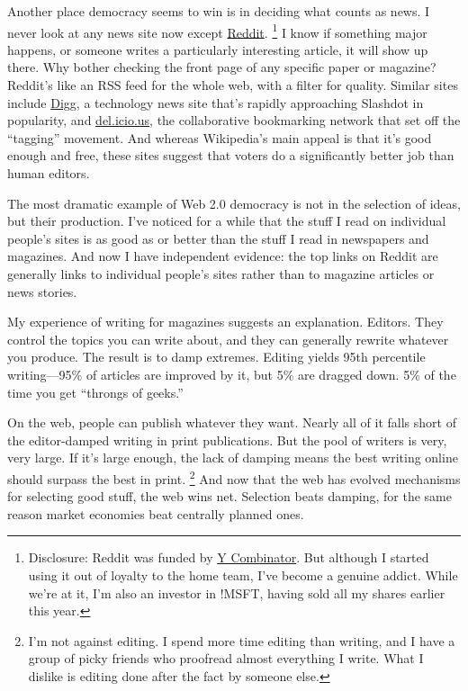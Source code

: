 Another place democracy seems to win is in deciding what counts as news.
I never look at any news site now except
\href{http://reddit.com}{Reddit}. \footnote{Disclosure: Reddit was funded by \href{http://ycombinator.com}{Y
Combinator}. But although I started using it out of loyalty to the home
team, I've become a genuine addict. While we're at it, I'm also an
investor in !MSFT, having sold all my shares earlier this year.} I know if
something major happens, or someone writes a particularly interesting
article, it will show up there. Why bother checking the front page of
any specific paper or magazine? Reddit's like an RSS feed for the whole
web, with a filter for quality. Similar sites include
\href{http://digg.com}{Digg}, a technology news site that's rapidly
approaching Slashdot in popularity, and
\href{http://del.icio.us}{del.icio.us}, the collaborative bookmarking
network that set off the ``tagging'' movement. And whereas Wikipedia's
main appeal is that it's good enough and free, these sites suggest that
voters do a significantly better job than human editors.

The most dramatic example of Web 2.0 democracy is not in the selection
of ideas, but their production. I've noticed for a while that the stuff
I read on individual people's sites is as good as or better than the
stuff I read in newspapers and magazines. And now I have independent
evidence: the top links on Reddit are generally links to individual
people's sites rather than to magazine articles or news stories.

My experience of writing for magazines suggests an explanation. Editors.
They control the topics you can write about, and they can generally
rewrite whatever you produce. The result is to damp extremes. Editing
yields 95th percentile writing---95\% of articles are improved by it,
but 5\% are dragged down. 5\% of the time you get ``throngs of geeks.''

On the web, people can publish whatever they want. Nearly all of it
falls short of the editor-damped writing in print publications. But the
pool of writers is very, very large. If it's large enough, the lack of
damping means the best writing online should surpass the best in print.
\footnote{I'm not against editing. I spend more time editing than writing,
and I have a group of picky friends who proofread almost everything I
write. What I dislike is editing done after the fact by someone else.} And now that the web has evolved mechanisms for
selecting good stuff, the web wins net. Selection beats damping, for the
same reason market economies beat centrally planned ones.

